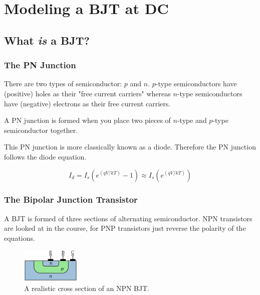 
\section{Modeling a BJT at DC}

\subsection{What \textit{is} a BJT?}

\subsubsection{The PN Junction}

There are two types of semiconductor: $p$ and $n$. $p$-type semiconductors have (positive) holes as their "free current carriers" whereas $n$-type semiconductors have (negative) electrons as their free current carriers.

A PN junction is formed when you place two pieces of $n$-type and $p$-type semiconductor together.

This PN junction is more classically known as a diode. Therefore the PN junction follows the diode equation.

\begin{equation}
\label{eqn-diode}
I_d = I_s \left(e^{(qV/kT)} - 1\right) \approx I_s \left(e^{(qV/kT)}\right)
\end{equation}

\subsubsection{The Bipolar Junction Transistor}

A BJT is formed of three sections of alternating semiconductor. NPN transistors are looked at in the course, for PNP transistors just reverse the polarity of the equations.

\begin{figure}[H]
\centering
\includegraphics[width=0.25\textwidth]{images/npn-bjt-cross.png}
\caption{A realistic cross section of an NPN BJT.}
\end{figure}

